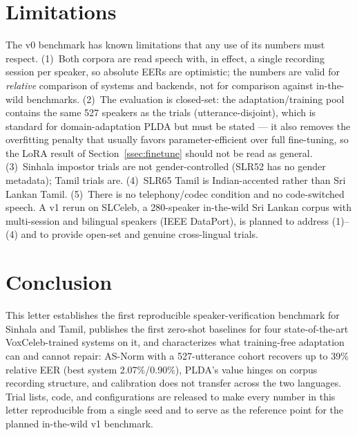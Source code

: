 \documentclass[journal]{IEEEtran}
\begin{document}
\section{Limitations}
\label{sec:limitations}

The v0 benchmark has known limitations that any use of its numbers
must respect. (1)~Both corpora are read speech with, in effect, a
single recording session per speaker, so absolute EERs are
optimistic; the numbers are valid for \emph{relative} comparison of
systems and backends, not for comparison against in-the-wild
benchmarks. (2)~The evaluation is closed-set: the adaptation/training
pool contains the same 527 speakers as the trials
(utterance-disjoint), which is standard for domain-adaptation PLDA
but must be stated --- it also removes the overfitting penalty that
usually favors parameter-efficient over full fine-tuning, so the
LoRA result of Section~\ref{ssec:finetune} should not be read as
general. (3)~Sinhala impostor trials are not gender-controlled
(SLR52 has no gender metadata); Tamil trials are. (4)~SLR65 Tamil is
Indian-accented rather than Sri Lankan Tamil. (5)~There is no
telephony/codec condition and no code-switched speech. A v1 rerun on
SLCeleb, a 280-speaker in-the-wild Sri Lankan corpus with
multi-session and bilingual speakers (IEEE DataPort), is planned to
address (1)--(4) and to provide open-set and genuine cross-lingual
trials.

\section{Conclusion}
\label{sec:conclusion}

This letter establishes the first reproducible speaker-verification
benchmark for Sinhala and Tamil, publishes the first zero-shot
baselines for four state-of-the-art VoxCeleb-trained systems on it,
and characterizes what training-free adaptation can and cannot
repair: AS-Norm with a 527-utterance cohort recovers up to 39\%
relative EER (best system 2.07\%/0.90\%), PLDA's value hinges on
corpus recording structure, and calibration does not transfer across
the two languages. Trial lists, code, and configurations are
released to make every number in this letter reproducible from a
single seed and to serve as the reference point for the planned
in-the-wild v1 benchmark.



\end{document}
